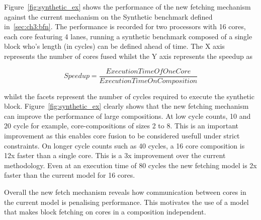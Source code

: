 Figure~\ref{fig:synthetic_ex} shows the performance of the new fetching mechanism against the current mechanism on the Synthetic benchmark defined in~\ref{sec:ch3:bfn}.
The performance is recorded for two processors with 16 cores, each core featuring 4 lanes, running a synthetic benchmark composed of a single block who's length (in cycles) can be defined ahead of time.
The X axis represents the number of cores fused whilst the Y axis represents the speedup as 

\begin{equation}
Speedup = \frac{ExecutionTimeOfOneCore}{ExecutionTimeOnComposition}
\end{equation}

whilst the facets represent the number of cycles required to execute the synthetic block.
Figure~\ref{fig:synthetic_ex} clearly shows that the new fetching mechanism can improve the performance of large compositions.
At low cycle counts, 10 and 20 cycle for example, core-compositions of sizes 2 to 8.
This is an important improvement as this enables core fusion to be considered usefull under strict constraints.
On longer cycle counts such as 40 cycles, a 16 core composition is 12x faster than a single core.
This is a 3x improvement over the current methodology.
Even at an execution time of 80 cycles the new fetching model is 2x faster than the current model for 16 cores.

Overall the new fetch mechanism reveals how communication between cores in the current model is penalising performance.
This motivates the use of a model that makes block fetching on cores in a composition independent.